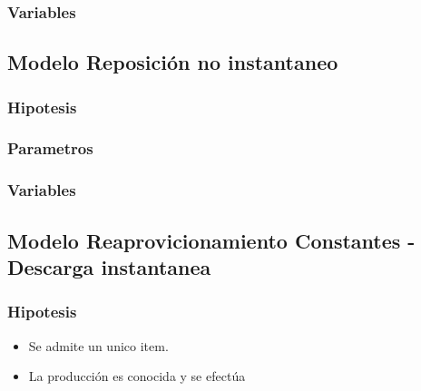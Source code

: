\documentclass{article}
\begin{document}
\subsubsection{Variables}

\subsection{Modelo Reposición no instantaneo}


\subsubsection{Hipotesis}

\subsubsection{Parametros}

\subsubsection{Variables}

\subsection{Modelo Reaprovicionamiento Constantes - Descarga instantanea}

\subsubsection{Hipotesis}
\begin{itemize}
    \item Se admite un unico item.
    \item La producción es conocida y se efectúa
\end{itemize}
\end{document}
